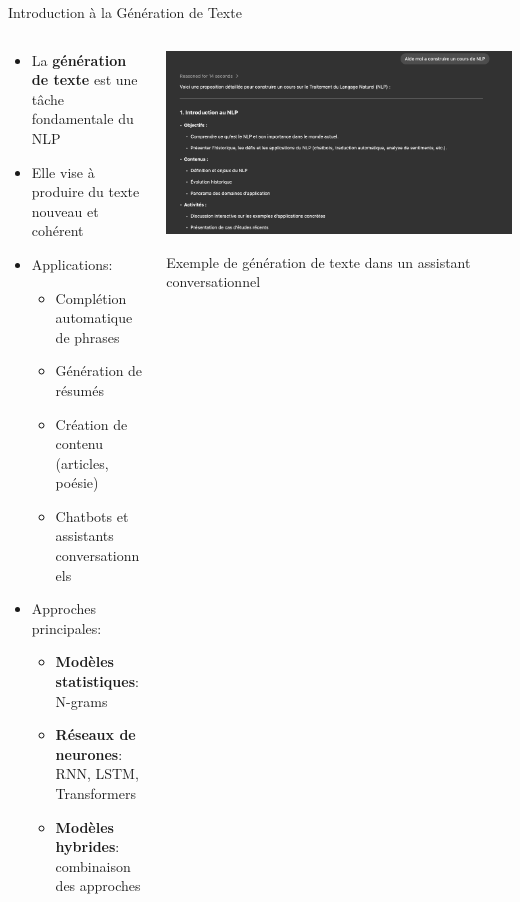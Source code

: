 \documentclass[aspectratio=169,11pt]{beamer}
\begin{document}
\begin{frame}{Introduction à la Génération de Texte}
    \begin{columns}
        \begin{column}{0.55\textwidth}
            \begin{itemize}
                \item La \textbf{génération de texte} est une tâche fondamentale du NLP
                \item Elle vise à produire du texte nouveau et cohérent
                \item Applications:
                \begin{itemize}
                    \item Complétion automatique de phrases
                    \item Génération de résumés
                    \item Création de contenu (articles, poésie)
                    \item Chatbots et assistants conversationnels
                \end{itemize}
                \vspace{0.3cm}
                \item Approches principales:
                \begin{itemize}
                    \item \textbf{Modèles statistiques}: N-grams
                    \item \textbf{Réseaux de neurones}: RNN, LSTM, Transformers
                    \item \textbf{Modèles hybrides}: combinaison des approches
                \end{itemize}
            \end{itemize}
        \end{column}
        \begin{column}{0.45\textwidth}
            \includegraphics[width=\textwidth]{images/chatbot.png}
            \begin{center}
                \small{Exemple de génération de texte dans un assistant conversationnel}
            \end{center}
        \end{column}
    \end{columns}
\end{frame}
\end{document}
